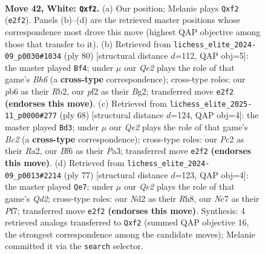\documentclass[11pt]{article}
\begin{document}
\clearpage

\begin{figure}[p]\centering
\begin{subfigure}{0.46\textwidth}\centering
\resizebox{\linewidth}{!}{%
\newchessgame
\chessboard[
  setfen={1rb2r2/p1N2p1k/1p3Bp1/2qB4/7P/1P6/R1PNQp2/R5K1 w - - 0 42},
  showmover=false,
  pgfstyle=straightmove, color=movearrow, markmove={e2-f2}
]}
\caption{}
\end{subfigure}\hfill
\begin{subfigure}{0.46\textwidth}\centering
\resizebox{\linewidth}{!}{%
\newchessgame
\chessboard[
  setfen={2rr3k/p3pp1p/6pB/4q3/1Qb3P1/3p3P/PR4B1/5R1K w - - 0 41},
  showmover=false,
  pgfstyle=straightmove, color=movearrow, markmove={h6-f4}
]}
\caption{}
\end{subfigure}
\\[4pt]
\begin{subfigure}{0.46\textwidth}\centering
\resizebox{\linewidth}{!}{%
\newchessgame
\chessboard[
  setfen={3rbk2/5p1Q/5b1p/1p1p4/2rp4/P5P1/R1BNqP1P/1R4K1 w - - 10 35},
  showmover=false,
  pgfstyle=straightmove, color=movearrow, markmove={c2-d3}
]}
\caption{}
\end{subfigure}\hfill
\begin{subfigure}{0.46\textwidth}\centering
\resizebox{\linewidth}{!}{%
\newchessgame
\chessboard[
  setfen={r6r/3q1p1k/4PRbP/p2p2P1/3P1Q2/8/P4B2/1R4K1 b - - 0 39},
  showmover=false,
  pgfstyle=straightmove, color=movearrow, markmove={d7-e7}
]}
\caption{}
\end{subfigure}
\caption{\textbf{Move 42, White: \texttt{Qxf2}.} (a) Our position; Melanie plays \texttt{Qxf2} (\texttt{e2f2}). Panels (b)--(d) are the retrieved master positions whose correspondence most drove this move (highest QAP objective among those that transfer to it). (b) Retrieved from \texttt{lichess\_elite\_2024-09\_p0030\#1034} (ply 80) [structural distance $d$=112, QAP obj=5]: the master played \texttt{Bf4}; under $\mu$ our \emph{Qe2} plays the role of that game's \emph{Bh6} (a \textbf{cross-type} correspondence); cross-type roles: our \emph{p}b6 as their \emph{R}b2, our \emph{p}f2 as their \emph{B}g2; transferred move \texttt{e2f2} \textbf{(endorses this move)}. (c) Retrieved from \texttt{lichess\_elite\_2025-11\_p0000\#277} (ply 68) [structural distance $d$=124, QAP obj=4]: the master played \texttt{Bd3}; under $\mu$ our \emph{Qe2} plays the role of that game's \emph{Bc2} (a \textbf{cross-type} correspondence); cross-type roles: our \emph{P}c2 as their \emph{R}a2, our \emph{B}f6 as their \emph{P}a3; transferred move \texttt{e2f2} \textbf{(endorses this move)}. (d) Retrieved from \texttt{lichess\_elite\_2024-09\_p0013\#2214} (ply 77) [structural distance $d$=123, QAP obj=4]: the master played \texttt{Qe7}; under $\mu$ our \emph{Qe2} plays the role of that game's \emph{Qd2}; cross-type roles: our \emph{N}d2 as their \emph{R}h8, our \emph{N}c7 as their \emph{P}f7; transferred move \texttt{e2f2} \textbf{(endorses this move)}. Synthesis: 4 retrieved analogs transferred to \texttt{Qxf2} (summed QAP objective 16, the strongest correspondence among the candidate moves); Melanie committed it via the \texttt{search} selector.}
\label{fig:thought-m82}
\end{figure}
\end{document}

